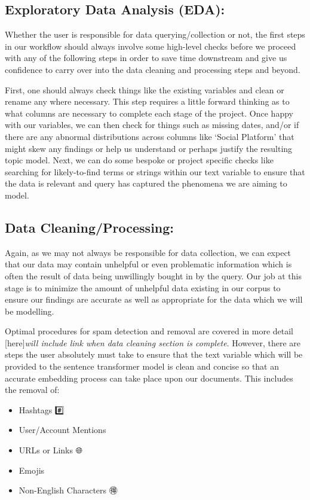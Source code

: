 \documentclass[
  letterpaper,
  DIV=11,
  numbers=noendperiod]{scrreprt}
\providecommand{\tightlist}{%
  \setlength{\itemsep}{0pt}\setlength{\parskip}{0pt}}\usepackage{longtable,booktabs,array}
\begin{document}
\subsection{Exploratory Data Analysis
(EDA):}\label{exploratory-data-analysis-eda}

Whether the user is responsible for data querying/collection or not, the
first steps in our workflow should always involve some high-level checks
before we proceed with any of the following steps in order to save time
downstream and give us confidence to carry over into the data cleaning
and processing steps and beyond.

First, one should always check things like the existing variables and
clean or rename any where necessary. This step requires a little forward
thinking as to what columns are necessary to complete each stage of the
project. Once happy with our variables, we can then check for things
such as missing dates, and/or if there are any abnormal distributions
across columns like `Social Platform' that might skew any findings or
help us understand or perhaps justify the resulting topic model. Next,
we can do some bespoke or project specific checks like searching for
likely-to-find terms or strings within our text variable to ensure that
the data is relevant and query has captured the phenomena we are aiming
to model.

\subsection{Data Cleaning/Processing:}\label{data-cleaningprocessing}

Again, as we may not always be responsible for data collection, we can
expect that our data may contain unhelpful or even problematic
information which is often the result of data being unwillingly bought
in by the query. Our job at this stage is to minimize the amount of
unhelpful data existing in our corpus to ensure our findings are
accurate as well as appropriate for the data which we will be modelling.

Optimal procedures for spam detection and removal are covered in more
detail {[}here{]}\emph{will include link when data cleaning section is
complete}. However, there are steps the user absolutely must take to
ensure that the text variable which will be provided to the sentence
transformer model is clean and concise so that an accurate embedding
process can take place upon our documents. This includes the removal of:

\begin{itemize}
\tightlist
\item
  Hashtags \#️⃣
\item
  User/Account Mentions 💬
\item
  URLs or Links 🌐
\item
  Emojis 🐙
\item
  Non-English Characters 🉐
\end{itemize}
\end{document}
